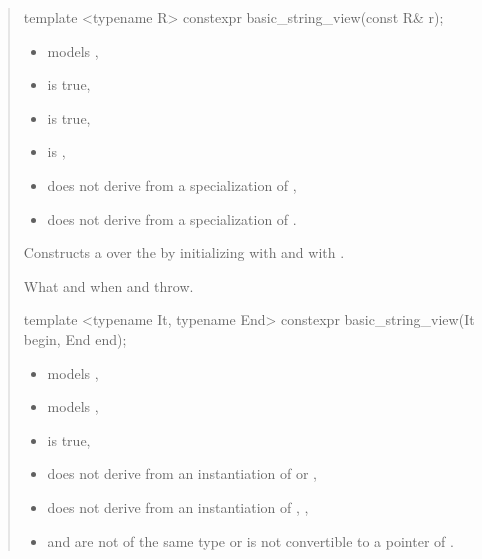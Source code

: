 \documentclass{wg21}
\begin{document}
\begin{quote}
\begin{addedblock}
\begin{itemdecl}
template <typename R>
constexpr basic_string_view(const R& r);

\end{itemdecl}

\begin{itemdescr}
    \constraints
    \begin{itemize}
        \item {} models ,
        \item {} is true,
        \item {} is true,
        \item {} is ,
        \item {} does not derive from a specialization of ,
        \item {} does not derive from a specialization of .
    \end{itemize}

    \effects
    Constructs a  over the   by initializing  with  and  with .


    \throws
    What and when  and  throw.



\end{itemdescr}

\begin{itemdecl}
template <typename It, typename End>
constexpr basic_string_view(It begin, End end);

\end{itemdecl}

\begin{itemdescr}
    \constraints
    \begin{itemize}
        \item {} models ,
        \item {} models ,
        \item {} is true,
        \item {} does not derive from an instantiation of   or  ,
        \item {} does not derive from an instantiation of  ,
        ,
        \item {} and  are not of the same type or  is not convertible to a pointer of .
    \end{itemize}


\end{itemdescr}
\end{addedblock}
\end{quote}
\end{document}
